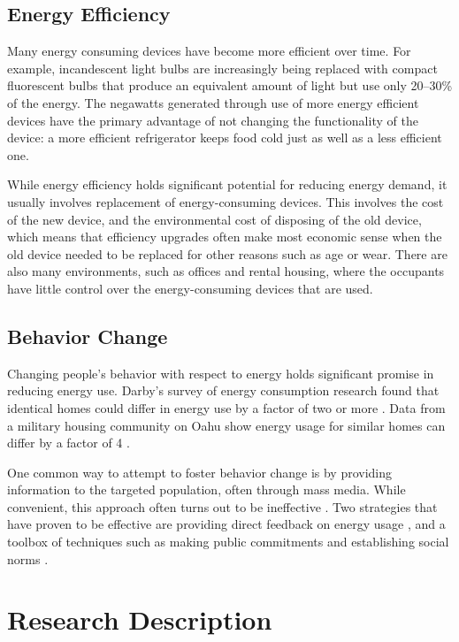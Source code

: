 \subsection{Energy Efficiency}

Many energy consuming devices have become more efficient over time. For example, incandescent light bulbs are increasingly being replaced with compact fluorescent bulbs that produce an equivalent amount of light but use only 20--30\% of the energy. The negawatts generated through use of more energy efficient devices have the primary advantage of not changing the functionality of the device: a more efficient refrigerator keeps food cold just as well as a less efficient one.

While energy efficiency holds significant potential for reducing energy demand, it usually involves replacement of energy-consuming devices. This involves the cost of the new device, and the environmental cost of disposing of the old device, which means that efficiency upgrades often make most economic sense when the old device needed to be replaced for other reasons such as age or wear. There are also many environments, such as offices and rental housing, where the occupants have little control over the energy-consuming devices that are used.

\subsection{Behavior Change}

Changing people's behavior with respect to energy holds significant promise in reducing energy use. Darby's survey of energy consumption research found that identical homes could differ in energy use by a factor of two or more \cite{darby-review-2006}. Data from a military housing community on Oahu show energy usage for similar homes can differ by a factor of 4 \cite{Norton2010ZeroEnergyHomes}.

One common way to attempt to foster behavior change is by providing information to the targeted population, often through mass media. While convenient, this approach often turns out to be ineffective \cite{McKenzie-Mohr2009}. Two strategies that have proven to be effective are providing direct feedback on energy usage \cite{darby-review-2006}, and a toolbox of techniques such as making public commitments and establishing social norms \cite{McKenzie-Mohr2009}. 


\section{Research Description}


